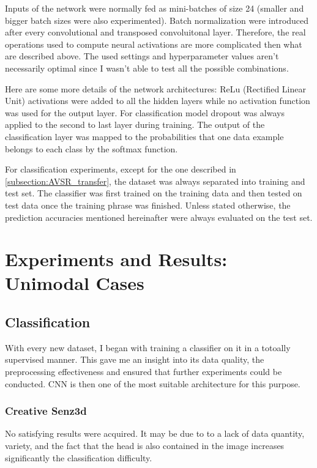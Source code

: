Inputs of the network were normally fed as mini-batches of size 24
(smaller and bigger batch sizes were also experimented).
Batch normalization \cite{S. Ioffe 2015} were introduced after every
convolutional and transposed convoluitonal layer. Therefore, the real
operations used to compute neural activations are more complicated
then what are described above. The used settings and hyperparameter
values aren't necessarily optimal since I wasn't able to test all the
possible combinations.

Here are some more details of the network architectures: ReLu
(Rectified Linear Unit) activations were added to all the hidden layers
\cite{A. Krizhevsky 2012} while no activation function was used for
the output layer.
For classification model dropout \cite{N. Srivastava 2014}
was always applied to the second to last layer during training.
The output of the classification layer was mapped to the probabilities
that one data example belongs to each class by the softmax function.

For classification experiments, except for the one described in
\ref{subsection:AVSR_transfer}, the dataset was always separated into
training and test set. The classifier was first trained on the training data
and then tested on test data once the training phrase was finished.
Unless stated otherwise, the prediction accuracies mentioned hereinafter
were always evaluated on the test set.

\section{Experiments and Results: Unimodal Cases} \label{section:uni}

\subsection{Classification} \label{subsection:classif}

With every new dataset, I began with training a classifier on it in a
totoally supervised manner.
This gave me an insight into its data quality, the preprocessing
effectiveness and ensured that further experiments could be conducted.
CNN is then one of the most suitable architecture for this purpose.

\subsubsection{Creative Senz3d}

No satisfying results were acquired. It may be due to to a lack of data
quantity, variety, and the fact that the head is also contained in the
image increases significantly the classification difficulty.

